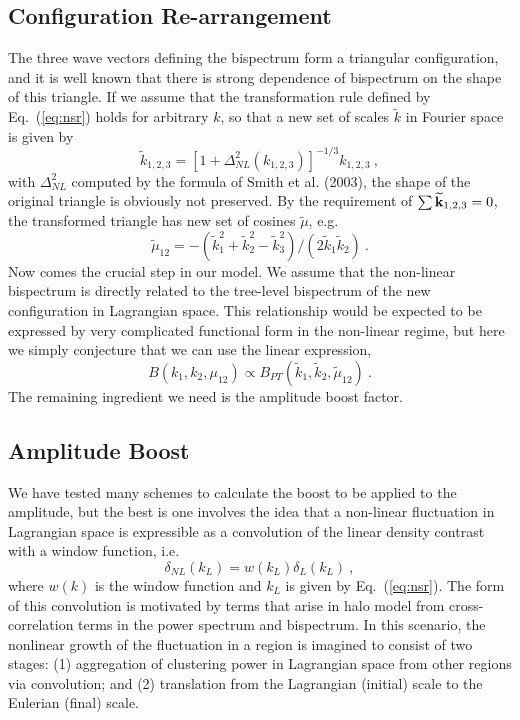 \documentclass[]{mn2e}
\begin{document}
\subsection{Configuration Re-arrangement}
The three wave vectors defining the bispectrum form a triangular
configuration, and it is well known that there is strong dependence
of bispectrum on the shape of this triangle. If we assume that the
transformation rule defined by Eq.~(\ref{eq:nsr}) holds for
arbitrary $k$, so that a new set of scales $\widetilde{k}$ in
Fourier space is given by
\begin{equation}
\widetilde{k}_{1, 2, 3}=\left[ 1+\Delta_{NL}^2 (k_{1,2,3}) \right]^{-1/3} k_{1, 2, 3} \ ,
\end{equation}
with $\Delta_{NL}^2$ computed by the formula of Smith et al. (2003),
the shape of the original triangle is obviously not preserved. By
the requirement of $\sum {\bf \widetilde{k}}_{1,2,3}=0$, the
transformed triangle has new set of cosines $\widetilde{\mu}$, e.g.
\begin{equation}
\widetilde{\mu}_{12}=-(\widetilde{k}_1^2+\widetilde{k}_2^2-\widetilde{k}_3^2)/(2 \widetilde{k}_1
\widetilde{k}_2) \ .
\end{equation}
Now comes the crucial step in our model. We assume that the
non-linear bispectrum is directly related to the tree-level
bispectrum of the new configuration in Lagrangian space. This
relationship would be expected to be expressed by very complicated
functional form in the non-linear regime, but here we simply
conjecture that we can use the linear expression,
\begin{equation}
B(k_1, k_2, \mu_{12})\propto B_{PT}(\widetilde{k}_1,\widetilde{k}_2, \widetilde{\mu}_{12})\ .
\end{equation}
The remaining ingredient we need is the amplitude boost factor.

\subsection{Amplitude Boost}
We have tested many schemes to calculate the boost to be applied to
the amplitude, but the best is one involves the idea that a
non-linear fluctuation in Lagrangian space is expressible as a
convolution of the linear density contrast with a window function,
i.e.
\begin{equation}
\delta_{NL}(k_L)=w(k_L) \delta_L(k_L)\ ,
\end{equation}
where $w(k)$ is the window function and $k_L$ is given by
Eq.~(\ref{eq:nsr}). The form of this convolution is motivated by
terms that arise in halo model from cross-correlation terms in the
power spectrum and bispectrum. In this scenario, the nonlinear
growth of the fluctuation in a region is imagined to consist of two
stages: (1) aggregation of clustering power in Lagrangian space from
other regions via convolution; and (2) translation from the
Lagrangian (initial) scale to the Eulerian (final) scale.
\end{document}
